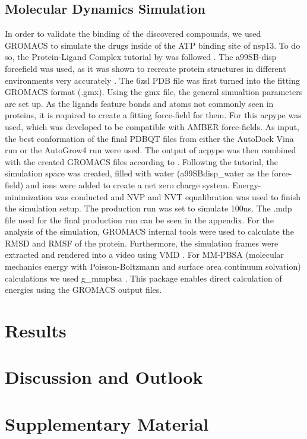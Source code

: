 \documentclass[11pt, letterpaper, titlepage]{article}
\renewcommand{\cite}{\parencite}
\begin{document}
\subsection{Molecular Dynamics Simulation}
In order to validate the binding of the discovered compounds, we used GROMACS to simulate the drugs inside of the ATP binding site of nsp13. To do so, the Protein-Ligand Complex tutorial by  was followed \cite{Lemkul2018}. The a99SB-disp forcefield was used, as it was shown to recreate protein structures in different environments very accurately \cite{Forcefield}. The 6zsl PDB file was first turned into the fitting GROMACS format (.gmx). Using the gmx file, the general simualtion parameters are set up. As the ligands feature bonds and atoms not commonly seen in proteins, it is required to create a fitting force-field for them. For this acpype \cite{acpype} was used, which was developed to be compatible with AMBER force-fields. As input, the best conformation of the final PDBQT files from either the AutoDock Vina run or the AutoGrow4 run were used. The output of acpype was then combined with the created GROMACS files according to . Following the tutorial, the simulation space was created, filled with water (a99SBdisp\_water as the force-field) and ions were added to create a net zero charge system. Energy-minimization was conducted and NVP and NVT equalibration was used to finish the simulation setup. The production run was set to simulate 100ns. The .mdp file used for the final production run can be seen in the appendix. 
For the analysis of the simulation, GROMACS internal tools were used to calculate the RMSD and RMSF of the protein. Furthermore, the simulation frames were extracted and rendered into a video using VMD \cite{VMD}. For MM-PBSA (molecular mechanics energy with Poisson-Boltzmann and surface area continuum solvation) calculations we used g\_mmpbsa \cite{MMPBSA1, MMPBSA2}. This package enables direct calculation of energies using the GROMACS output files.
\section{Results} 

\FloatBarrier

\section{Discussion and Outlook}

\section{Supplementary Material}

\pagebreak
\FloatBarrier

\renewcommand{\bibname}{References}  %
\printbibliography
\end{document}
